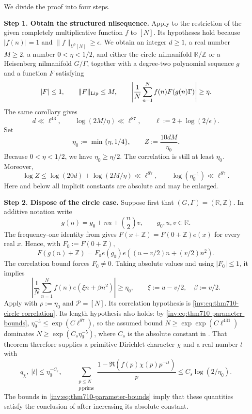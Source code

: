 \documentclass[twoside]{aomart}
\makeatletter
\theoremstyle{paperplain}
\theoremstyle{paperdefinition}
\renewenvironment{proof}[1][\proofname]{\par\pushQED{\qed}%
  \normalfont\topsep6\p@\@plus3\p@\relax\trivlist
  \item[\hskip\labelsep\itshape #1\@addpunct{.}]\ignorespaces
}{\popQED\endtrivlist\@endpefalse}
\numberwithin{equation}{section}
\makeatother
\begin{document}
\begin{proof}
We divide the proof into four steps.	
	
\par
\medskip
\noindent\textbf{Step 1. Obtain the structured nilsequence.}
Apply  to the restriction of the given
completely multiplicative function $f$ to $[N]$.  Its hypotheses hold because
$|f(n)|=1$ and $\|f\|_{U^3[N]}\ge\epsilon$.  We obtain an integer
$d\ge1$, a real number $M\ge2$, a number $0<\eta<1/2$, and either the
circle nilmanifold $\mathbb R/\mathbb Z$ or a Heisenberg nilmanifold
$G/\Gamma$, together with a degree-two polynomial sequence $g$ and a
function $F$ satisfying
\[
 |F|\le1,\qquad \|F\|_{\rm Lip}\le M,\qquad
 \left|\frac1N\sum_{n=1}^{N}f(n)F(g(n)\Gamma)\right|\ge\eta.
\]
The same corollary gives
\begin{equation*}
 d\ll\ell^{43},\qquad \log(2M/\eta)\ll\ell^{87},
 \qquad \ell:=2+\log(2/\epsilon).
\end{equation*}
Set
\[
 \eta_0:=\min\{\eta,1/4\},
 \qquad Z:=\frac{10dM}{\eta_0}.
\]
Because $0<\eta<1/2$, we have $\eta_0\ge\eta/2$.  The correlation is
still at least $\eta_0$.  Moreover,
\begin{equation}
 \log Z\le \log(20d)+\log(2M/\eta)\ll\ell^{87},
 \qquad \log(\eta_0^{-1})\ll\ell^{87}.
 \label{inv:eq:thm710-parameter-bounds}
\end{equation}
Here and below all implicit constants are absolute and may be enlarged.

\par
\medskip
\noindent\textbf{Step 2. Dispose of the circle case.}
Suppose first that $(G,\Gamma)=(\mathbb R,\mathbb Z)$.  In additive
notation write
\[
 g(n)=g_0+nu+\binom n2v,
 \qquad g_0,u,v\in\mathbb R.
\]
The frequency-one identity from  gives
$F(x+\mathbb Z)=F(0+\mathbb Z)e(x)$ for every real $x$.  Hence, with
$F_0:=F(0+\mathbb Z)$,
\[
 F(g(n)+\mathbb Z)=F_0e(g_0)e\!\left((u-v/2)n+(v/2)n^2\right).
\]
The correlation bound forces $F_0\ne0$.  Taking absolute values and
using $|F_0|\le1$, it implies
\begin{equation}
 \left|\frac1N\sum_{n=1}^{N}f(n)e(\xi n+\beta n^2)\right|
 \ge\eta_0,
 \qquad \xi:=u-v/2,\quad \beta:=v/2.
 \label{inv:eq:thm710-circle-correlation}
\end{equation}
Apply  with
$\rho:=\eta_0$ and $\mathcal P=[N]$.  Its correlation hypothesis is
\eqref{inv:eq:thm710-circle-correlation}.  Its length hypothesis also holds:
by \eqref{inv:eq:thm710-parameter-bounds},
$\eta_0^{-5}\le\exp(C\ell^{87})$, so the assumed bound
$N\ge\exp\exp(C\ell^{431})$ dominates
$N\ge\exp(C_s\eta_0^{-5})$, where $C_s$ is the absolute constant in
.  That theorem therefore supplies a
primitive Dirichlet character $\chi$ and a real number $t$ with
\[
 q_\chi,\ |t|\le\eta_0^{-C_s},
 \qquad
 \sum_{\substack{p\le N\\p\ \mathrm{prime}}}\frac{1-\Re(f(p)\overline{\chi(p)}p^{-it})}{p}
 \le C_s\log(2/\eta_0).
\]
The bounds in \eqref{inv:eq:thm710-parameter-bounds} imply that these
quantities satisfy the conclusion of  after
increasing its absolute constant.


\end{proof}
\end{document}
